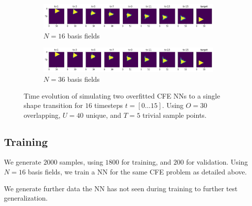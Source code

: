\begin{figure}
  \centering
  \begin{subfigure}{\textwidth}
    \centering
    \includegraphics[width=\textwidth]{figures/nn-training/NN_N16_triangle_overfit_horizontal.png}
    \caption{$N=16$ basis fields}
  \end{subfigure}
  \begin{subfigure}{\textwidth}
    \centering
    \includegraphics[width=\textwidth]{figures/nn-training/NN_N36_triangle_overfit_horizontal.png}
    \caption{$N=36$ basis fields}
  \end{subfigure}
  \caption{Time evolution of simulating two overfitted \ac{CFE} \acp{NN} to
  a single shape transition for $16$ timesteps $t=[0\dots15]$. Using $O=30$
overlapping, $U=40$ unique, and $T=5$  trivial sample points.}
  \label{fig:NN-overfit}
\end{figure}

\subsection*{Training}
We generate $2000$ samples, using $1800$ for training, and $200$ for validation.
Using $N=16$ basis fields, we train a \ac{NN} for the same \ac{CFE} problem as
detailed above. 

We generate further data the \ac{NN} has not seen during training to further
test generalization. 

